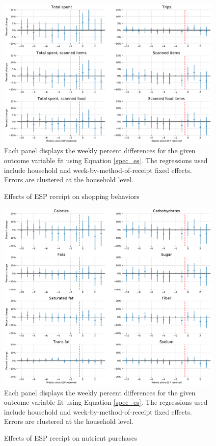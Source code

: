 \documentclass[12pt]{article}
\begin{document}
\clearpage
\begin{figure}[t]
\begin{center}
\caption{Effects of ESP receipt on shopping behaviors}
\label{es_behaviors_all}
\includegraphics[width=1\textwidth, angle=0]{../figures/es_behaviors_all.pdf}
\footnotesize Each panel displays the weekly percent differences for the given outcome variable fit using Equation \ref{spec_es}. The regressions used include household and week-by-method-of-receipt fixed effects. Errors are clustered at the household level. \end{center}
\end{figure}

\clearpage
\begin{figure}[t]
\begin{center}
\caption{Effects of ESP receipt on nutrient purchases}
\label{es_nutrients_all}
\includegraphics[width=1\textwidth, angle=0]{../figures/es_nutrients_all.pdf}
\footnotesize Each panel displays the weekly percent differences for the given outcome variable fit using Equation \ref{spec_es}. The regressions used include household and week-by-method-of-receipt fixed effects. Errors are clustered at the household level. \end{center}
\end{figure}
\end{document}

